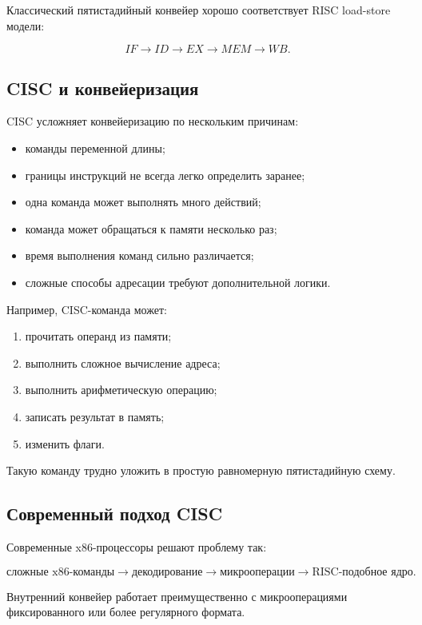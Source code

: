 \documentclass[12pt,a4paper]{article}
\begin{document}
Классический пятистадийный конвейер хорошо соответствует RISC load-store модели:

\[
    IF \rightarrow ID \rightarrow EX \rightarrow MEM \rightarrow WB.
\]

\subsection{CISC и конвейеризация}

CISC усложняет конвейеризацию по нескольким причинам:

\begin{itemize}
    \item команды переменной длины;
    \item границы инструкций не всегда легко определить заранее;
    \item одна команда может выполнять много действий;
    \item команда может обращаться к памяти несколько раз;
    \item время выполнения команд сильно различается;
    \item сложные способы адресации требуют дополнительной логики.
\end{itemize}

Например, CISC-команда может:

\begin{enumerate}
    \item прочитать операнд из памяти;
    \item выполнить сложное вычисление адреса;
    \item выполнить арифметическую операцию;
    \item записать результат в память;
    \item изменить флаги.
\end{enumerate}

Такую команду трудно уложить в простую равномерную пятистадийную схему.

\subsection{Современный подход CISC}

Современные x86-процессоры решают проблему так:

\[
\text{сложные x86-команды}
\rightarrow
\text{декодирование}
\rightarrow
\text{микрооперации}
\rightarrow
\text{RISC-подобное ядро}.
\]

Внутренний конвейер работает преимущественно с микрооперациями фиксированного или более регулярного формата.
\end{document}
